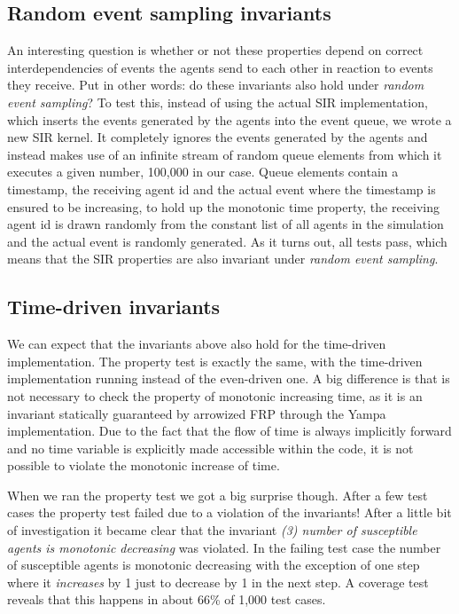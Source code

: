 \subsection{Random event sampling invariants}
An interesting question is whether or not these properties depend on correct interdependencies of events the agents send to each other in reaction to events they receive. Put in other words: do these invariants also hold under \textit{random event sampling}? To test this, instead of using the actual SIR implementation, which inserts the events generated by the agents into the event queue, we wrote a new SIR kernel. It completely ignores the events generated by the agents and instead makes use of an infinite stream of random queue elements from which it executes a given number, 100,000 in our case. Queue elements contain a timestamp, the receiving agent id and the actual event where the timestamp is ensured to be increasing, to hold up the monotonic time property, the receiving agent id is drawn randomly from the constant list of all agents in the simulation and the actual event is randomly generated. As it turns out, all tests pass, which means that the SIR properties are also invariant under \textit{random event sampling}.

\subsection{Time-driven invariants}
We can expect that the invariants above also hold for the time-driven implementation. The property test is exactly the same, with the time-driven implementation running instead of the even-driven one. A big difference is that is not necessary to check the property of monotonic increasing time, as it is an invariant statically guaranteed by arrowized FRP through the Yampa implementation. Due to the fact that the flow of time is always implicitly forward and no time variable is explicitly made accessible within the code, it is not possible to violate the monotonic increase of time.

When we ran the property test we got a big surprise though. After a few test cases the property test failed due to a violation of the invariants! After a little bit of investigation it became clear that the invariant \textit{(3) number of susceptible agents is monotonic decreasing} was violated. In the failing test case the number of susceptible agents is monotonic decreasing with the exception of one step where it \textit{increases} by 1 just to decrease by 1 in the next step. A coverage test reveals that this happens in about 66\% of 1,000 test cases.

